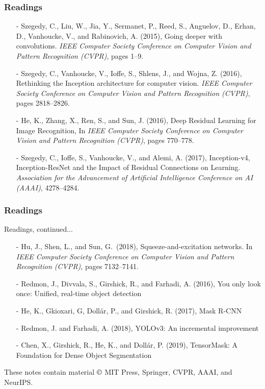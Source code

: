 \documentclass[aspectratio=169]{beamer}
\begin{document}
\begin{frame}
\frametitle{Readings}

\begin{itemize}
\item[-] Szegedy, C., Liu, W., Jia, Y., Sermanet, P., Reed, S.,
  Anguelov, D., Erhan, D., Vanhoucke, V., and Rabinovich, A. (2015),
  Going deeper with convolutions.  \textit{IEEE Computer Society
    Conference on Computer Vision and Pattern Recognition (CVPR)},
  pages 1--9.
\item[-] Szegedy, C., Vanhoucke, V., Ioffe, S., Shlens, J., and Wojna,
  Z. (2016), Rethinking the Inception architecture for computer
  vision. \textit{IEEE Computer Society Conference on Computer Vision
    and Pattern Recognition (CVPR)}, pages 2818--2826.
\item[-] He, K., Zhang, X., Ren, S., and Sun, J. (2016), Deep Residual
  Learning for Image Recognition, In \textit{IEEE Computer Society
    Conference on Computer Vision and Pattern Recognition (CVPR)},
  pages 770--778.
\item[-] Szegedy, C., Ioffe, S., Vanhoucke, V., and Alemi, A. (2017),
  Inception-v4, Inception-ResNet and the Impact of Residual
  Connections on Learning. \textit{Association for the Advancement of
    Artificial Intelligence Conference on AI (AAAI)}, 4278--4284.
\end{itemize}

\end{frame}


\begin{frame}
\frametitle{Readings}

Readings, continued...
\begin{itemize}
\item[-] Hu, J., Shen, L., and Sun, G.\ (2018), Squeeze-and-excitation
  networks.  In \textit{IEEE Computer Society Conference on Computer
    Vision and Pattern Recognition (CVPR)}, pages 7132--7141.
\item[-] Redmon, J., Divvala, S., Girshick, R., and Farhadi, A. (2016),
  You only look once: Unified, real-time object detection
\item[-] He, K., Gkioxari, G, Dollár, P., and Girshick, R. (2017),
  Mask R-CNN
\item[-] Redmon, J. and Farhadi, A. (2018), YOLOv3: An incremental
  improvement
\item[-] Chen, X., Girshick, R., He, K., and Dollár, P. (2019),
  TensorMask: A Foundation for Dense Object Segmentation
\end{itemize}

These notes contain material $\copyright$ MIT Press, Springer,
CVPR, AAAI, and NeurIPS.

\end{frame}
\end{document}
